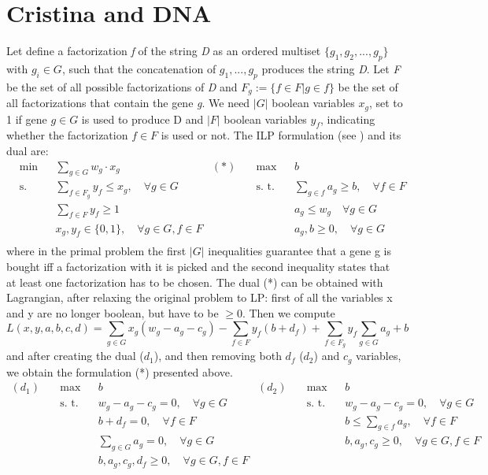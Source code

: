 \section{Cristina and DNA}
Let define a factorization \textit{f} of the string \textit{D} as an ordered multiset $\{g_1, g_2, ..., g_p\}$ with $g_i \in G$, such that the concatenation of $g_1, ..., g_p$ produces the string \textit{D}. Let \textit{F} be the set of all possible factorizations of \textit{D} and $F_g:= \{f \in F | g \in f\}$ be the set of all factorizations that contain the gene \textit{g}. We need $|G|$ boolean variables $x_g$, set to 1 if gene $g \in G$ is used to produce D and $|F|$ boolean variables $y_f$, indicating whether the factorization $f \in F$ is used or not. The ILP formulation (see \cite{String cover}) and its dual are:
\begin{align*}
&\text{min} && \sum_{g \in G} w_g \cdot x_g & (*) \quad & \text{max}&& b  \\
&\text{s. t.} && \sum_{f \in F_g} y_f \leq x_g, \quad \forall g \in G &&\text{s. t.} && \sum_{g \in f} a_g \geq b, \quad \forall f \in F \\
&&& \sum_{f \in F} y_f \geq 1 &&&&  a_g \leq w_g \quad \forall g \in G\\
&&& x_g,y_f \in \{0,1\}, \quad \forall g \in G, f \in F &&&& a_g,b \geq 0, \quad \forall g \in G\\
\end{align*}
where in the primal problem the first $|G|$ inequalities guarantee that a gene g is bought iff a factorization with it is picked and the second inequality states that at least one factorization has to be chosen. The dual (*) can be obtained with Lagrangian, after relaxing the original problem to LP: first of all the variables x and y are no longer boolean, but have to be $\geq 0$. Then we compute
\[
L(x,y,a,b,c,d) = \sum_{g \in G} x_g (w_g - a_g - c_g) - \sum_{f \in F} y_f (b + d_f) + \sum_{f \in F_g} y_f\sum_{g \in G} a_g + b
\]
and after creating the dual ($d_1$), and then removing both $d_f$ ($d_2$) and $c_g$ variables, we obtain the formulation (*) presented above.
\begin{align*}
(d_1) \quad&\text{max} && b & (d_2)\quad& \text{max}&& b  \\
&\text{s. t.} && w_g -a_g-c_g = 0, \quad \forall g \in G &&\text{s. t.} && w_g - a_g -c_g = 0, \quad \forall g \in G \\
&&& b +d_f = 0, \quad \forall f \in F &&&&  b \leq \sum_{g \in f} a_g, \quad \forall f \in F\\
&&&\sum_{g \in G} a_g = 0, \quad \forall g \in G &&&& b,a_g,c_g \geq 0, \quad \forall g \in G, f \in F\\
&&& b,a_g,c_g,d_f \geq 0, \quad \forall g \in G, f \in F  &&&&\\
\end{align*}
